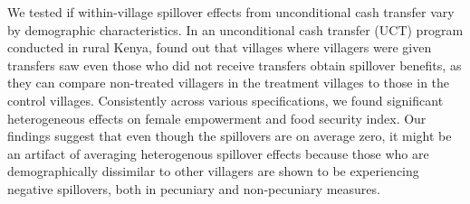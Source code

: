 \documentclass[11pt]{article}
\begin{document}
    We tested if within-village spillover effects from unconditional cash transfer vary by demographic characteristics. In an unconditional cash transfer (UCT) program conducted in rural Kenya, \textcite{haushofer_short-term_2016} found out that villages where villagers were given transfers saw even those who did not receive transfers obtain spillover benefits, as they can compare non-treated villagers in the treatment villages to those in the control villages. Consistently across various specifications, we found significant heterogeneous effects on female empowerment and food security index. Our findings suggest that even though the spillovers are on average zero, it might be an artifact of averaging heterogenous spillover effects because those who are demographically dissimilar to other villagers are shown to be experiencing negative spillovers, both in pecuniary and non-pecuniary measures.


\newpage

\printbibliography
\end{document}
